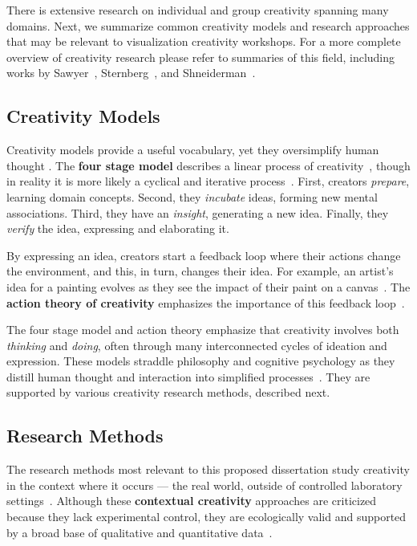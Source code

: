There is extensive research on individual and group creativity spanning many domains. Next, we summarize common creativity models and research approaches that may be relevant to visualization creativity workshops. For a more complete overview of creativity research please refer to summaries of this field, including works by Sawyer~\cite{Sawyer2006,Sawyer2003},  Sternberg~\cite{Sernberg1999}, and Shneiderman~\cite{Shneiderman2005}.

\subsection*{Creativity Models}

Creativity models provide a useful vocabulary, yet they oversimplify human thought \cite{Sawyer2006}. The {\bf four stage model} describes a linear process of creativity~\cite{Hadamard1945,Poincare1982,Wallas1926}, though in reality it is more likely a cyclical and iterative process~\cite{Sawyer2006}. First, creators \emph{prepare}, learning domain concepts. Second, they \emph{incubate} ideas, forming new mental associations. Third, they have an \emph{insight}, generating a new idea. Finally, they \emph{verify} the idea, expressing and elaborating it. 

By expressing an idea, creators start a feedback loop where their actions change the environment, and this, in turn, changes their idea. For example, an artist's idea for a painting evolves as they see the impact of their paint on a canvas~\cite{Glaveanu2013}. The {\bf action theory of creativity} emphasizes the importance of this feedback loop~\cite{Sawyer2006}. 

The four stage model and action theory emphasize that creativity involves both \emph{thinking} and \emph{doing}, often through many interconnected cycles of ideation and expression. These models straddle philosophy and cognitive psychology as they distill human thought and interaction into simplified processes~\cite{Sawyer2006}. They are supported by various creativity research methods, described next. 

\subsection*{Research Methods}

The research methods most relevant to this proposed dissertation study creativity in the context where it occurs --- the real world, outside of controlled laboratory settings~\cite{Mayer1999}. Although these {\bf contextual creativity} approaches are criticized because they lack experimental control, they are ecologically valid and supported by a broad base of qualitative and quantitative data~\cite{Mayer1999}.

